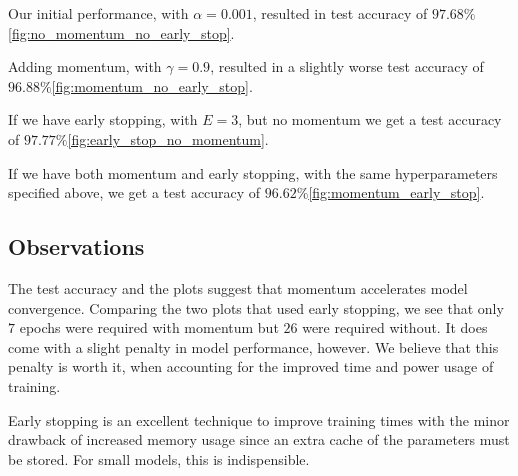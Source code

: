 Our initial performance, with $\alpha = 0.001$, resulted in test accuracy of $97.68\%$\cref{fig:no_momentum_no_early_stop}.


Adding momentum, with $\gamma = 0.9$, resulted in a slightly worse test accuracy of $96.88\%$\cref{fig:momentum_no_early_stop}.

If we have early stopping, with $E=3$, but no momentum we get a test accuracy of $97.77\%$\cref{fig:early_stop_no_momentum}.

If we have both momentum and early stopping, with the same hyperparameters specified above,
we get a test accuracy of $96.62\%$\cref{fig:momentum_early_stop}.


\subsection{Observations}

The test accuracy and the plots suggest that momentum accelerates model convergence.
Comparing the two plots that used early stopping, we see that only $7$ epochs were required
with momentum but $26$ were required without. It does come with a slight penalty in model performance,
however. We believe that this penalty is worth it, when accounting for the improved time and power
usage of training.

Early stopping is an excellent  technique to improve training times with the minor drawback of increased memory usage
since an extra cache of the parameters must be stored. For small models, this is indispensible.
